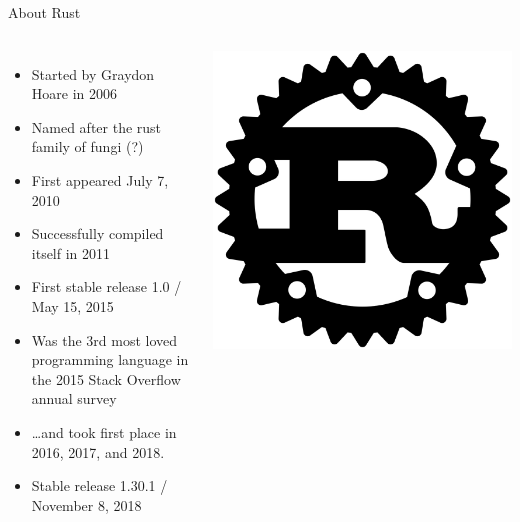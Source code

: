 \documentclass{beamer}
\begin{document}
    \begin{frame}{About Rust}
        \begin{columns}
            \begin{itemize}
                \item Started by Graydon Hoare in 2006
                \item Named after the rust family of fungi (?)
                \item First appeared July 7, 2010
                \item Successfully compiled itself in 2011
                \item First stable release 1.0 / May 15, 2015
                \item Was the 3rd most loved programming language in the 2015 Stack Overflow annual survey
                \item \ldots and took first place in 2016, 2017, and 2018.
                \item Stable release 1.30.1 / November 8, 2018
            \end{itemize}
            \includegraphics[width=\textwidth]{rust_logo}
        \end{columns}
    \end{frame}
\end{document}
